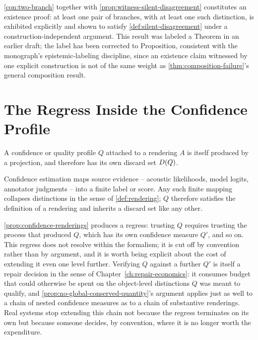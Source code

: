 \begin{proofsketch}
\cref{con:two-branch} together with \cref{prop:witness-silent-disagreement}
constitutes an existence proof: at least one pair of branches, with at
least one such distinction, is exhibited explicitly and shown to satisfy
\cref{def:silent-disagreement} under a construction-independent argument.
This result was labeled a Theorem in an earlier draft; the label has been
corrected to Proposition, consistent with the monograph's
epistemic-labeling discipline, since an existence claim witnessed by one
explicit construction is not of the same weight as
\cref{thm:composition-failure}'s general composition result.
\end{proofsketch}

\section{The Regress Inside the Confidence Profile}

\begin{proposition}
\label{prop:confidence-renderings}
A confidence or quality profile $Q$ attached to a rendering $A$ is itself
produced by a projection, and therefore has its own discard set
$D(Q)$.
\end{proposition}

\begin{proofsketch}
Confidence estimation maps source evidence -- acoustic likelihoods, model
logits, annotator judgments -- into a finite label or score. Any such
finite mapping collapses distinctions in the sense of
\cref{def:rendering}; $Q$ therefore satisfies the definition of a
rendering and inherits a discard set like any other.
\end{proofsketch}

\cref{prop:confidence-renderings} produces a regress: trusting $Q$
requires trusting the process that produced $Q$, which has its own
confidence measure $Q'$, and so on. This regress does not resolve within
the formalism; it is cut off by convention rather than by argument, and
it is worth being explicit about the cost of extending it even one level
further. Verifying $Q$ against a further $Q'$ is itself a repair
decision in the sense of Chapter~\ref{ch:repair-economics}: it consumes
budget that could otherwise be spent on the object-level distinctions
$Q$ was meant to qualify, and \cref{prop:no-global-conserved-quantity}'s
argument applies just as well to a chain of nested confidence measures as
to a chain of substantive renderings. Real systems stop extending this
chain not because the regress terminates on its own but because someone
decides, by convention, where it is no longer worth the expenditure.

